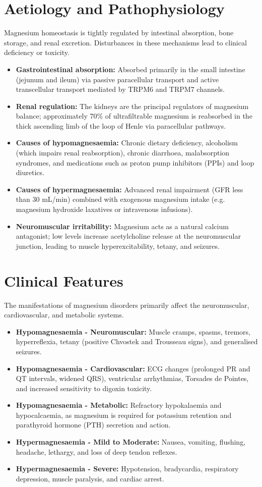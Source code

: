 \section*{Aetiology and Pathophysiology}
Magnesium homeostasis is tightly regulated by intestinal absorption, bone storage, and renal excretion. Disturbances in these mechanisms lead to clinical deficiency or toxicity.
\begin{itemize}
    \item \textbf{Gastrointestinal absorption:} Absorbed primarily in the small intestine (jejunum and ileum) via passive paracellular transport and active transcellular transport mediated by TRPM6 and TRPM7 channels.
    \item \textbf{Renal regulation:} The kidneys are the principal regulators of magnesium balance; approximately 70\% of ultrafiltrable magnesium is reabsorbed in the thick ascending limb of the loop of Henle via paracellular pathways.
    \item \textbf{Causes of hypomagnesaemia:} Chronic dietary deficiency, alcoholism (which impairs renal reabsorption), chronic diarrhoea, malabsorption syndromes, and medications such as proton pump inhibitors (PPIs) and loop diuretics.
    \item \textbf{Causes of hypermagnesaemia:} Advanced renal impairment (GFR less than 30 mL/min) combined with exogenous magnesium intake (e.g. magnesium hydroxide laxatives or intravenous infusions).
    \item \textbf{Neuromuscular irritability:} Magnesium acts as a natural calcium antagonist; low levels increase acetylcholine release at the neuromuscular junction, leading to muscle hyperexcitability, tetany, and seizures.
\end{itemize}

\section*{Clinical Features}
The manifestations of magnesium disorders primarily affect the neuromuscular, cardiovascular, and metabolic systems.
\begin{itemize}
    \item \textbf{Hypomagnesaemia - Neuromuscular:} Muscle cramps, spasms, tremors, hyperreflexia, tetany (positive Chvostek and Trousseau signs), and generalised seizures.
    \item \textbf{Hypomagnesaemia - Cardiovascular:} ECG changes (prolonged PR and QT intervals, widened QRS), ventricular arrhythmias, Torsades de Pointes, and increased sensitivity to digoxin toxicity.
    \item \textbf{Hypomagnesaemia - Metabolic:} Refractory hypokalaemia and hypocalcaemia, as magnesium is required for potassium retention and parathyroid hormone (PTH) secretion and action.
    \item \textbf{Hypermagnesaemia - Mild to Moderate:} Nausea, vomiting, flushing, headache, lethargy, and loss of deep tendon reflexes.
    \item \textbf{Hypermagnesaemia - Severe:} Hypotension, bradycardia, respiratory depression, muscle paralysis, and cardiac arrest.
\end{itemize}

